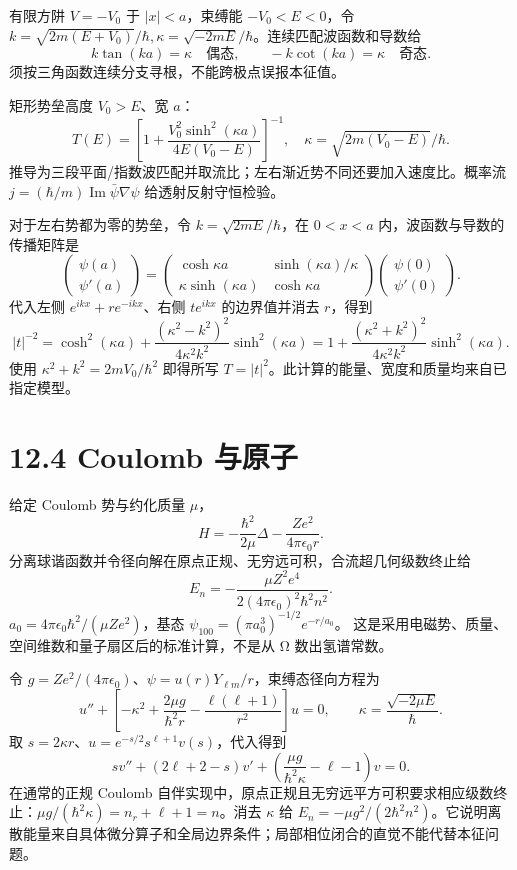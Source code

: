 \documentclass[
  11pt,
  oneside]{book}
\begin{document}
有限方阱 \(V=-V_0\) 于 \(|x|<a\)，束缚能 \(-V_0<E<0\)，令
\(k=\sqrt{2m(E+V_0)}/\hbar,\kappa=\sqrt{-2mE}/\hbar\)。连续匹配波函数和导数给
\[
k\tan(ka)=\kappa\quad\text{偶态},\qquad
-k\cot(ka)=\kappa\quad\text{奇态}.
\] 须按三角函数连续分支寻根，不能跨极点误报本征值。

矩形势垒高度 \(V_0>E\)、宽 \(a\)： \[
T(E)=\left[1+
\frac{V_0^2\sinh^2(\kappa a)}{4E(V_0-E)}
\right]^{-1},\quad
\kappa=\sqrt{2m(V_0-E)}/\hbar.
\]
推导为三段平面/指数波匹配并取流比；左右渐近势不同还要加入速度比。概率流
\(j=(\hbar/m)\operatorname{Im}\bar\psi\nabla\psi\) 给透射反射守恒检验。

对于左右势都为零的势垒，令 \(k=\sqrt{2mE}/\hbar\)，在 \(0<x<a\)
内，波函数与导数的传播矩阵是 \[
\begin{pmatrix}\psi(a)\\\psi'(a)\end{pmatrix}
=\begin{pmatrix}\cosh\kappa a&\sinh(\kappa a)/\kappa\\
\kappa\sinh(\kappa a)&\cosh\kappa a\end{pmatrix}
\begin{pmatrix}\psi(0)\\\psi'(0)\end{pmatrix}.
\] 代入左侧 \(e^{ikx}+re^{-ikx}\)、右侧 \(te^{ikx}\) 的边界值并消去
\(r\)，得到 \[
|t|^{-2}=\cosh^2(\kappa a)+
\frac{(\kappa^2-k^2)^2}{4\kappa^2k^2}\sinh^2(\kappa a)
=1+\frac{(\kappa^2+k^2)^2}{4\kappa^2k^2}\sinh^2(\kappa a).
\] 使用 \(\kappa^2+k^2=2mV_0/\hbar^2\) 即得所写
\(T=|t|^2\)。此计算的能量、宽度和质量均来自已指定模型。

\section{12.4 Coulomb 与原子}

给定 Coulomb 势与约化质量 \(\mu\)， \[
H=-\frac{\hbar^2}{2\mu}\Delta-\frac{Ze^2}{4\pi\epsilon_0r}.
\] 分离球谐函数并令径向解在原点正规、无穷远可积，合流超几何级数终止给 \[
E_n=-\frac{\mu Z^2e^4}{2(4\pi\epsilon_0)^2\hbar^2n^2}.
\] \(a_0=4\pi\epsilon_0\hbar^2/(\mu Ze^2)\)，基态
\(\psi_{100}=(\pi a_0^3)^{-1/2}e^{-r/a_0}\)。
这是采用电磁势、质量、空间维数和量子扇区后的标准计算，不是从 Ω
数出氢谱常数。

令
\(g=Ze^2/(4\pi\epsilon_0)\)、\(\psi=u(r)Y_{\ell m}/r\)，束缚态径向方程为
\[
u''+\left[-\kappa^2+\frac{2\mu g}{\hbar^2r}
-\frac{\ell(\ell+1)}{r^2}\right]u=0,
\qquad \kappa=\frac{\sqrt{-2\mu E}}{\hbar}.
\] 取 \(s=2\kappa r\)、\(u=e^{-s/2}s^{\ell+1}v(s)\)，代入得到 \[
s v''+(2\ell+2-s)v'+\left(\frac{\mu g}{\hbar^2\kappa}-\ell-1\right)v=0.
\] 在通常的正规 Coulomb
自伴实现中，原点正规且无穷远平方可积要求相应级数终止：\(\mu g/(\hbar^2\kappa)=n_r+\ell+1=n\)。消去
\(\kappa\) 给
\(E_n=-\mu g^2/(2\hbar^2n^2)\)。它说明离散能量来自具体微分算子和全局边界条件；局部相位闭合的直觉不能代替本征问题。
\end{document}
